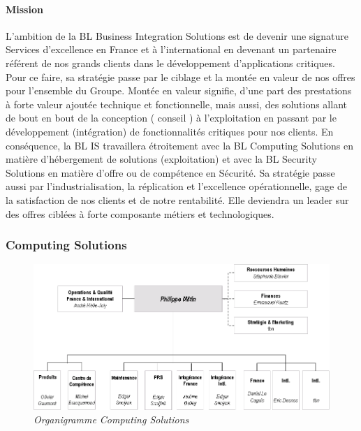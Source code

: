 \documentclass[11pt]{article}
\begin{document}
		\paragraph{Mission}
		L’ambition de la BL Business Integration Solutions est de devenir une signature Services d’excellence 
		en France et à l’international en devenant un partenaire référent de nos grands clients dans le 
		développement d’applications critiques. \newline
		Pour ce faire, sa stratégie passe par le ciblage et la montée en valeur de nos offres pour l’ensemble du 
		Groupe. Montée en valeur signifie,  d’une part des prestations à forte valeur ajoutée technique et 
		fonctionnelle, mais aussi, des solutions allant de bout en bout de la conception ( conseil ) à 
		l’exploitation en passant par le développement (intégration) de fonctionnalités critiques pour nos 
		clients. En conséquence, la BL IS travaillera étroitement avec la BL Computing Solutions en matière 
		d’hébergement de solutions (exploitation) et avec la BL Security Solutions en matière d’offre ou de 
		compétence en Sécurité. \newline
		Sa stratégie passe aussi par l’industrialisation, la réplication et l’excellence opérationnelle, gage de la 
		satisfaction de nos clients et de notre rentabilité. \newline
		Elle deviendra un leader sur des offres ciblées à forte composante métiers et technologiques.
		\newpage
		\subsubsection{Computing Solutions}
		\begin{figure}[!h]
		\centering \includegraphics[scale=0.4]{orga_compsol.png}
		\caption{\it Organigramme Computing Solutions}
		\end{figure}
\end{document}

